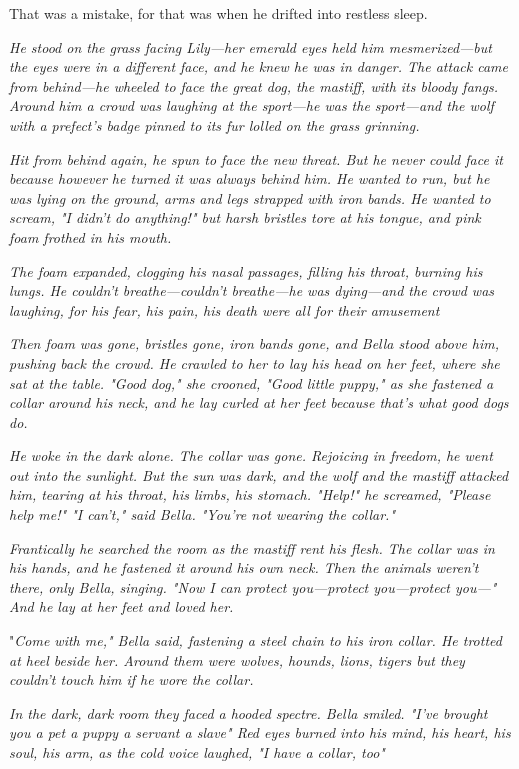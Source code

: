 That was a mistake, for that was when he drifted into restless sleep.

\sbreak

\emph{He stood on the grass facing Lily—her emerald eyes held him mesmerized—but the eyes were in a different face, and he knew he was in danger. The attack came from behind—he wheeled to face the great dog, the mastiff, with its bloody fangs. Around him a crowd was laughing at the sport—he was the sport—and the wolf with a prefect's badge pinned to its fur lolled on the grass grinning.}

\emph{Hit from behind again, he spun to face the new threat. But he never could face it because however he turned it was always behind him. He wanted to run, but he was lying on the ground, arms and legs strapped with iron bands. He wanted to scream, "I didn't do anything!" but harsh bristles tore at his tongue, and pink foam frothed in his mouth.}

\emph{The foam expanded, clogging his nasal passages, filling his throat, burning his lungs. He couldn't breathe—couldn't breathe—he was dying—and the crowd was laughing, for his fear, his pain, his death were all for their amusement{\el}}

\emph{Then foam was gone, bristles gone, iron bands gone, and Bella stood above him, pushing back the crowd. He crawled to her to lay his head on her feet, where she sat at the table. "Good dog," she crooned, "Good little puppy," as she fastened a collar around his neck, and he lay curled at her feet because that's what good dogs do.}

\emph{He woke in the dark alone. The collar was gone. Rejoicing in freedom, he went out into the sunlight. But the sun was dark, and the wolf and the mastiff attacked him, tearing at his throat, his limbs, his stomach. "Help!" he screamed, "Please help me!" "I can't," said Bella. "You're not wearing the collar."}

\emph{Frantically he searched the room as the mastiff rent his flesh. The collar was in his hands, and he fastened it around his own neck. Then the animals weren't there, only Bella, singing. "Now I can protect you—protect you—protect you—" And he lay at her feet and loved her.}

"\emph{Come with me," Bella said, fastening a steel chain to his iron collar. He trotted at heel beside her. Around them were wolves, hounds, lions, tigers{\el} but they couldn't touch him if he wore the collar.}

\emph{In the dark, dark room they faced a hooded spectre. Bella smiled. "I've brought you a pet{\el} a puppy{\el} a servant{\el} a slave{\el}" Red eyes burned into his mind, his heart, his soul, his arm, as the cold voice laughed, "I have a collar, too{\el}"}

